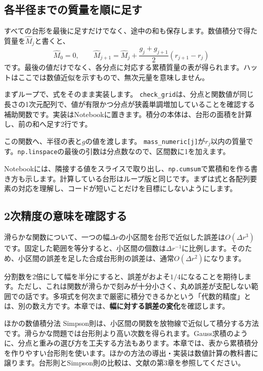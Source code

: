 \subsection{各半径までの質量を順に足す}
すべての台形を最後に足すだけでなく、途中の和も保存します。数値積分で得た質量を$\widehat M_j$と書くと、
\begin{equation}
 \widehat M_0=0,\qquad
 \widehat M_{j+1}=\widehat M_j+\frac{g_j+g_{j+1}}{2}(r_{j+1}-r_j)
 \label{eq:ch3-cumulative-trapezoid}
\end{equation}
です。最後の値だけでなく、各分点に対応する累積質量の表が得られます。ハットはここでは数値近似を示すもので、無次元量を意味しません。

まずループで、式をそのまま実装します。
\texttt{check\_grid}は、分点と関数値が同じ長さの1次元配列で、値が有限かつ分点が狭義単調増加していることを確認する補助関数です。実装はNotebookに置きます。積分の本体は、台形の面積を計算し、前の和へ足す2行です。

この関数へ、半径の表と$g$の値を渡します。
\texttt{mass\_numeric[j]}が$r_j$以内の質量です。\texttt{np.linspace}の最後の引数は分点数なので、区間数に1を加えます。

Notebookには、隣接する値をスライスで取り出し、\texttt{np.cumsum}で累積和を作る書き方も示します。計算している台形はループ版と同じです。まずは式と各配列要素の対応を理解し、コードが短いことだけを目標にしないようにします。

\subsection{2次精度の意味を確認する}
滑らかな関数について、一つの幅$\Delta r$の小区間を台形で近似した誤差は$O(\Delta r^3)$です。固定した範囲を等分すると、小区間の個数は$\Delta r^{-1}$に比例します。そのため、小区間の誤差を足した合成台形則の誤差は、通常$O(\Delta r^2)$になります。\cite{sugiura2009}

分割数を2倍にして幅を半分にすると、誤差がおよそ$1/4$になることを期待します。ただし、これは関数が滑らかで刻みが十分小さく、丸め誤差が支配しない範囲での話です。多項式を何次まで厳密に積分できるかという「代数的精度」とは、別の数え方です。本章では、\textbf{幅に対する誤差の変化}を確認します。

\begin{notebox}{ほかの数値積分法}
Simpson則は、小区間の関数を放物線で近似して積分する方法です。滑らかな問題では台形則より高い次数を得られます。Gauss求積のように、分点と重みの選び方を工夫する方法もあります。本章では、表から累積積分を作りやすい台形則を使います。ほかの方法の導出・実装は数値計算の教科書に譲ります。台形則とSimpson則の比較は、文献\cite{sugiura2009}の第3章を参照してください。
\end{notebox}

